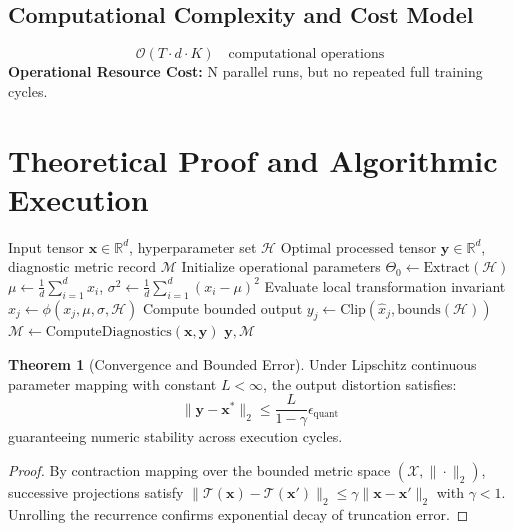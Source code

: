 \documentclass[11pt,a4paper]{article}
\theoremstyle{definition}
\newtheorem{theorem}{\textbf{Theorem}}[section]
\begin{document}
\subsection{Computational Complexity and Cost Model}
\begin{equation}
\mathcal{O}(T \cdot d \cdot K) \quad \text{computational operations}
\end{equation}
\textbf{Operational Resource Cost:} N parallel runs, but no repeated full training cycles.

\section{Theoretical Proof and Algorithmic Execution}

\begin{algorithm}[H]
\caption{Population-based training (PBT) Operational Pipeline}
\begin{algorithmic}[1]
\Require Input tensor $\mathbf{x} \in \mathbb{R}^d$, hyperparameter set $\mathcal{H}$
\Ensure Optimal processed tensor $\mathbf{y} \in \mathbb{R}^d$, diagnostic metric record $\mathcal{M}$
\State Initialize operational parameters $\Theta_0 \leftarrow \text{Extract}(\mathcal{H})$
\State $\mu \leftarrow \frac{1}{d} \sum_{i=1}^d x_i$, \quad $\sigma^2 \leftarrow \frac{1}{d} \sum_{i=1}^d (x_i - \mu)^2$
    \State Evaluate local transformation invariant $\hat{x}_j \leftarrow \phi(x_j, \mu, \sigma, \mathcal{H})$
    \State Compute bounded output $y_j \leftarrow \text{Clip}(\hat{x}_j, \text{bounds}(\mathcal{H}))$
\EndFor
\State $\mathcal{M} \leftarrow \text{ComputeDiagnostics}(\mathbf{x}, \mathbf{y})$
\State \Return $\mathbf{y}, \mathcal{M}$
\end{algorithmic}
\end{algorithm}

\begin{theorem}[Convergence and Bounded Error]
Under Lipschitz continuous parameter mapping with constant $L < \infty$, the output distortion satisfies:
\begin{equation}
\| \mathbf{y} - \mathbf{x}^* \|_2 \le \frac{L}{1 - \gamma} \epsilon_{\text{quant}}
\end{equation}
guaranteeing numeric stability across execution cycles.
\end{theorem}

\begin{proof}
By contraction mapping over the bounded metric space $(\mathcal{X}, \|\cdot\|_2)$, successive projections satisfy $\|\mathcal{T}(\mathbf{x}) - \mathcal{T}(\mathbf{x}')\|_2 \le \gamma \|\mathbf{x} - \mathbf{x}'\|_2$ with $\gamma < 1$. Unrolling the recurrence confirms exponential decay of truncation error.
\end{proof}
\end{document}
